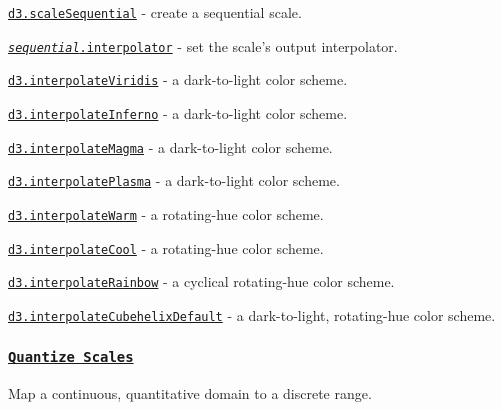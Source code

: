 \begin{DoxyItemize}
\item \href{https://github.com/d3/d3-scale/blob/master/README.md#scaleSequential}{\tt d3.\+scale\+Sequential} -\/ create a sequential scale.
\item \href{https://github.com/d3/d3-scale/blob/master/README.md#sequential_interpolator}{\tt {\itshape sequential}.interpolator} -\/ set the scale’s output interpolator.
\item \href{https://github.com/d3/d3-scale/blob/master/README.md#interpolateViridis}{\tt d3.\+interpolate\+Viridis} -\/ a dark-\/to-\/light color scheme.
\item \href{https://github.com/d3/d3-scale/blob/master/README.md#interpolateInferno}{\tt d3.\+interpolate\+Inferno} -\/ a dark-\/to-\/light color scheme.
\item \href{https://github.com/d3/d3-scale/blob/master/README.md#interpolateMagma}{\tt d3.\+interpolate\+Magma} -\/ a dark-\/to-\/light color scheme.
\item \href{https://github.com/d3/d3-scale/blob/master/README.md#interpolatePlasma}{\tt d3.\+interpolate\+Plasma} -\/ a dark-\/to-\/light color scheme.
\item \href{https://github.com/d3/d3-scale/blob/master/README.md#interpolateWarm}{\tt d3.\+interpolate\+Warm} -\/ a rotating-\/hue color scheme.
\item \href{https://github.com/d3/d3-scale/blob/master/README.md#interpolateCool}{\tt d3.\+interpolate\+Cool} -\/ a rotating-\/hue color scheme.
\item \href{https://github.com/d3/d3-scale/blob/master/README.md#interpolateRainbow}{\tt d3.\+interpolate\+Rainbow} -\/ a cyclical rotating-\/hue color scheme.
\item \href{https://github.com/d3/d3-scale/blob/master/README.md#interpolateCubehelixDefault}{\tt d3.\+interpolate\+Cubehelix\+Default} -\/ a dark-\/to-\/light, rotating-\/hue color scheme.
\end{DoxyItemize}

\subsubsection*{\href{https://github.com/d3/d3-scale/blob/master/README.md#quantize-scales}{\tt Quantize Scales}}

Map a continuous, quantitative domain to a discrete range.


